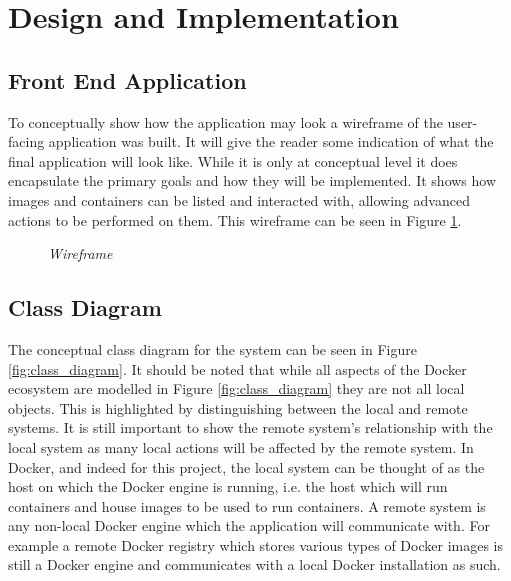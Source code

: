 \section{Design and Implementation}

\subsection{Front End Application}

To conceptually show how the application may look a wireframe of the user-facing application was built. It will give the reader some indication of what the final application will look like. While it is only at conceptual level it does encapsulate the primary goals and how they will be implemented. It shows how images and containers can be listed and interacted with, allowing advanced actions to be performed on them. This wireframe can be seen in Figure \ref{fig:wireframe}.
\begin{figure}[!ht]
\centering
{}
\caption{\em Wireframe}
\label{fig:wireframe}
\end{figure}

\subsection{Class Diagram}
The conceptual class diagram for the system can be seen in Figure \ref{fig:class_diagram}. It should be noted that while all aspects of the Docker ecosystem are modelled in Figure \ref{fig:class_diagram} they are not all local objects. This is highlighted by distinguishing between the local and remote systems. It is still important to show the remote system's relationship with the local system as many local actions will be affected by the remote system. In Docker, and indeed for this project, the local system can be thought of as the host on which the Docker engine is running, i.e. the host which will run containers and house images to be used to run containers. A remote system is any non-local Docker engine which the application will communicate with. For example a remote Docker registry which stores various types of Docker images is still a Docker engine and communicates with a local Docker installation as such.

